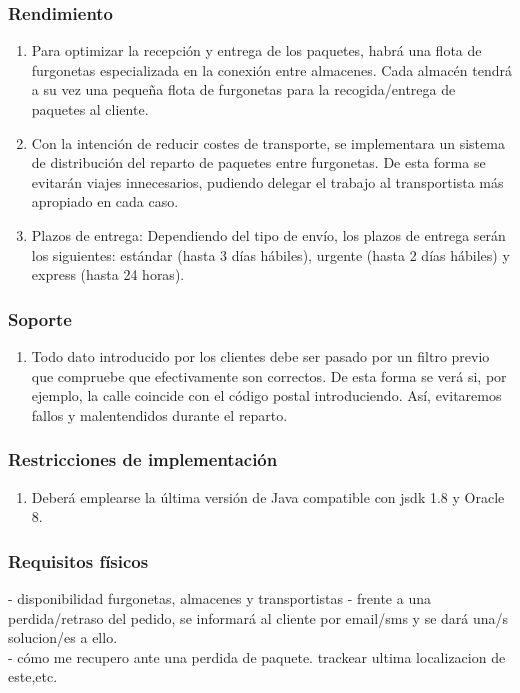 \subsubsection{Rendimiento}
\begin{enumerate}
	\item Para optimizar la recepción y entrega de los paquetes, habrá una flota de furgonetas especializada en la conexión entre almacenes. Cada almacén tendrá a su vez una pequeña flota de furgonetas para la recogida/entrega de paquetes al cliente.
	\item Con la intención de reducir costes de transporte, se implementara un sistema de distribución del reparto de paquetes entre furgonetas. De esta forma se evitarán viajes innecesarios, pudiendo delegar el trabajo al transportista más apropiado en cada caso.
	\item Plazos de entrega: Dependiendo del tipo de envío, los plazos de entrega serán los siguientes: estándar (hasta 3 días hábiles), urgente (hasta 2 días hábiles) y express (hasta 24 horas).
\end{enumerate}

\subsubsection{Soporte}
\begin{enumerate}
	\item Todo dato introducido por los clientes debe ser pasado por un filtro previo que compruebe que efectivamente son correctos. De esta forma se verá si, por ejemplo, la calle coincide con el código postal introduciendo. Así, evitaremos fallos y malentendidos durante el reparto.
\end{enumerate}
	
\subsubsection{Restricciones de implementación}
\begin{enumerate}
	\item Deberá emplearse la última versión de Java compatible con jsdk 1.8 y Oracle 8.
\end{enumerate}
\subsubsection{Requisitos físicos}
- disponibilidad furgonetas, almacenes y transportistas
- frente a una perdida/retraso del pedido, se informará al cliente por email/sms y se dará una/s solucion/es a ello.\\
- cómo me recupero ante una perdida de paquete. trackear ultima localizacion de este,etc.


